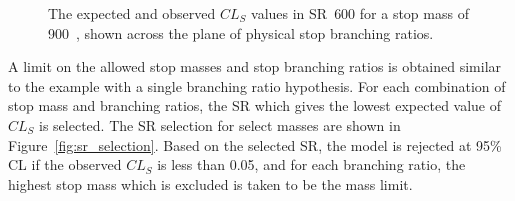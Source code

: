 \begin{figure}[ht]
  \centering
  \caption{
    The expected and observed $CL_S$ values in SR~600 for a stop mass of
    900~\GeV, shown across the plane of physical stop branching ratios.
  }
  \label{fig:cls_plane_sr_600_m_900}
\end{figure}

A limit on the allowed stop masses and stop branching ratios is obtained
similar to the example with a single branching ratio hypothesis.
For each combination of stop mass and branching ratios, the SR which gives the
lowest expected value of $CL_S$ is selected. The SR selection for select masses
are shown in Figure~\ref{fig:sr_selection}.
Based on the selected SR, the model is rejected at 95\% CL if the observed
$CL_S$ is less than 0.05, and for each branching ratio, the highest stop mass
which is excluded is taken to be the mass limit.

